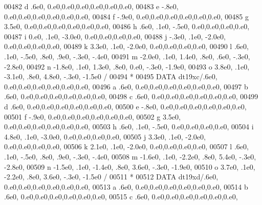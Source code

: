 \begin{DoxyCode}
00482      d            .6e0,                  0.e0,0.e0,0.e0,0.e0,0.e0,0.e0,
00483      e           -.8e0,                  0.e0,0.e0,0.e0,0.e0,0.e0,0.e0,
00484      f           -.9e0,                  0.e0,0.e0,0.e0,0.e0,0.e0,0.e0,
00485      g           3.5e0,                  0.e0,0.e0,0.e0,0.e0,0.e0,0.e0,
00486      h            .6e0,   .1e0,  -.5e0,             0.e0,0.e0,0.e0,0.e0,
00487      i           0.e0,    .1e0, -3.0e0,             0.e0,0.e0,0.e0,0.e0,
00488      j           -.3e0,   .1e0, -2.0e0,             0.e0,0.e0,0.e0,0.e0,
00489      k           3.3e0,   .1e0, -2.0e0,             0.e0,0.e0,0.e0,0.e0,
00490      l            .6e0,   .1e0,  -.5e0,   .8e0,   .9e0,  -.3e0,  -.4e0,
00491      m          -2.0e0,   .1e0,  1.4e0,   .8e0,   .6e0,  -.3e0, -2.8e0,
00492      n          -1.8e0,   .1e0,  1.3e0,   .8e0,  0.e0,   -.3e0, -1.9e0,
00493      o           3.8e0,   .1e0, -3.1e0,   .8e0,  4.8e0,  -.3e0, -1.5e0 /
00494 \textcolor{comment}{*}
00495       \textcolor{keyword}{DATA} dt19xc/.6e0,                  0.e0,0.e0,0.e0,0.e0,0.e0,0.e0,
00496      a            .6e0,                  0.e0,0.e0,0.e0,0.e0,0.e0,0.e0,
00497      b            .6e0,                  0.e0,0.e0,0.e0,0.e0,0.e0,0.e0,
00498      c            .6e0,                  0.e0,0.e0,0.e0,0.e0,0.e0,0.e0,
00499      d            .6e0,                  0.e0,0.e0,0.e0,0.e0,0.e0,0.e0,
00500      e           -.8e0,                  0.e0,0.e0,0.e0,0.e0,0.e0,0.e0,
00501      f           -.9e0,                  0.e0,0.e0,0.e0,0.e0,0.e0,0.e0,
00502      g           3.5e0,                  0.e0,0.e0,0.e0,0.e0,0.e0,0.e0,
00503      h            .6e0,   .1e0,  -.5e0,             0.e0,0.e0,0.e0,0.e0,
00504      i           4.8e0,   .1e0, -3.0e0,             0.e0,0.e0,0.e0,0.e0,
00505      j           3.3e0,   .1e0, -2.0e0,             0.e0,0.e0,0.e0,0.e0,
00506      k           2.1e0,   .1e0, -2.0e0,             0.e0,0.e0,0.e0,0.e0,
00507      l            .6e0,   .1e0,  -.5e0,   .8e0,   .9e0,  -.3e0,  -.4e0,
00508      m          -1.6e0,   .1e0, -2.2e0,   .8e0,  5.4e0,  -.3e0, -2.8e0,
00509      n          -1.5e0,   .1e0, -1.4e0,   .8e0,  3.6e0,  -.3e0, -1.9e0,
00510      o           3.7e0,   .1e0, -2.2e0,   .8e0,  3.6e0,  -.3e0, -1.5e0 /
00511 \textcolor{comment}{*}
00512       \textcolor{keyword}{DATA} dt19xd/.6e0,                  0.e0,0.e0,0.e0,0.e0,0.e0,0.e0,
00513      a            .6e0,                  0.e0,0.e0,0.e0,0.e0,0.e0,0.e0,
00514      b            .6e0,                  0.e0,0.e0,0.e0,0.e0,0.e0,0.e0,
00515      c            .6e0,                  0.e0,0.e0,0.e0,0.e0,0.e0,0.e0,

\end{DoxyCode}
